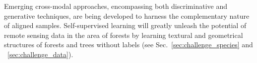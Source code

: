 \documentclass{CUP-JNL-DTM}%
\theoremstyle{definition}
\numberwithin{equation}{section}
\begin{document}
Emerging cross-modal approaches, encompassing both discriminative \cite{jain_multimodal_2022} and generative \cite{jain_multi-modal_2023} techniques, are being developed to harness the complementary nature of aligned samples.
%
Self-supervised learning will greatly unleash the potential of remote sensing data in the area of forests \cite{ge_novel_2023} by learning textural and geometrical structures of forests and trees without labels (see Sec.~\ref{sec:challenge_species} and ~\ref{sec:challenge_data}).
\end{document}
